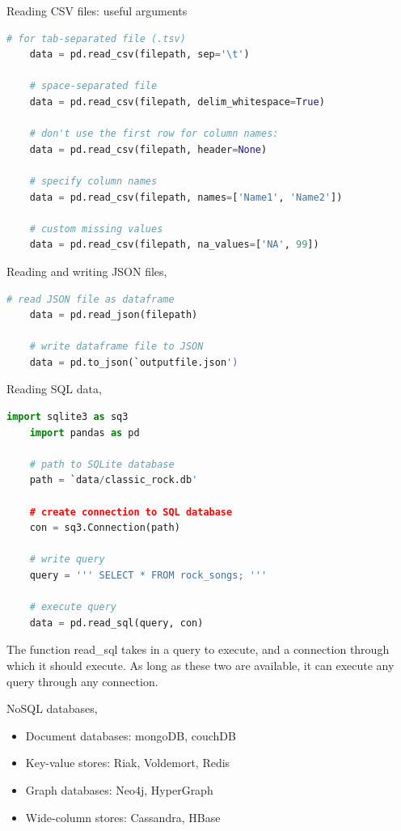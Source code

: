 \documentclass{article}
\theoremstyle{mytheoremstyle}
\theoremstyle{mytheoremstyle}
\theoremstyle{myproblemstyle}
\begin{document}
    \noindent Reading CSV files: useful arguments
    \begin{lstlisting}[language=Python]
    # for tab-separated file (.tsv)
    data = pd.read_csv(filepath, sep='\t')

    # space-separated file
    data = pd.read_csv(filepath, delim_whitespace=True)

    # don't use the first row for column names:
    data = pd.read_csv(filepath, header=None)

    # specify column names
    data = pd.read_csv(filepath, names=['Name1', 'Name2'])

    # custom missing values
    data = pd.read_csv(filepath, na_values=['NA', 99])
    \end{lstlisting}

    \vspace{1cm}

    \noindent Reading and writing JSON files,
    \begin{lstlisting}[language=Python]
    # read JSON file as dataframe
    data = pd.read_json(filepath)

    # write dataframe file to JSON
    data = pd.to_json(`outputfile.json')
    \end{lstlisting}

    \vspace{1cm}

    \noindent Reading SQL data,
    \begin{lstlisting}[language=Python]
    import sqlite3 as sq3
    import pandas as pd

    # path to SQLite database
    path = `data/classic_rock.db'

    # create connection to SQL database
    con = sq3.Connection(path)

    # write query
    query = ''' SELECT * FROM rock_songs; '''

    # execute query
    data = pd.read_sql(query, con)
    \end{lstlisting}

    \vspace{1cm}

    \noindent The function read\_sql takes in a query to execute, and a
    connection through which it should execute. As long as these two
    are available, it can execute any query through any connection.

    \pagebreak

    \noindent NoSQL databases,
    \begin{itemize}
    	\item Document databases: mongoDB, couchDB
	\item Key-value stores: Riak, Voldemort, Redis
	\item Graph databases: Neo4j, HyperGraph
	\item Wide-column stores: Cassandra, HBase
    \end{itemize}
\end{document}
